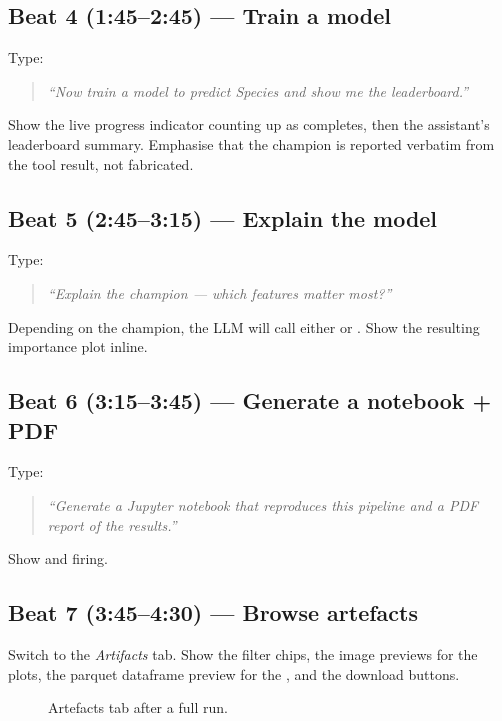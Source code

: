 \subsection*{Beat 4 (1:45--2:45) --- Train a model}
Type:
\begin{quote}
\emph{``Now train a model to predict Species and show me the
leaderboard.''}
\end{quote}
Show the live progress indicator counting up as
 completes, then the assistant's
leaderboard summary. Emphasise that the champion is reported
verbatim from the tool result, not fabricated.

\subsection*{Beat 5 (2:45--3:15) --- Explain the model}
Type:
\begin{quote}
\emph{``Explain the champion --- which features matter most?''}
\end{quote}
Depending on the champion, the LLM will call either
 or
. Show the resulting
importance plot inline.

\subsection*{Beat 6 (3:15--3:45) --- Generate a notebook + PDF}
Type:
\begin{quote}
\emph{``Generate a Jupyter notebook that reproduces this pipeline
and a PDF report of the results.''}
\end{quote}
Show  and
 firing.

\subsection*{Beat 7 (3:45--4:30) --- Browse artefacts}
Switch to the \emph{Artifacts} tab. Show the filter chips, the
image previews for the plots, the parquet dataframe preview for the
, and the download buttons.

\begin{figure}[H]
\centering
{}
\caption{Artefacts tab after a full run.}
\label{fig:demo-4}
\end{figure}

